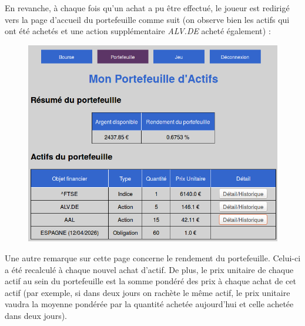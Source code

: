 \begin{enumerate}
      En revanche, à chaque fois qu'un achat a pu être effectué, le joueur est redirigé vers la page d'accueil du portefeuille comme suit (on observe bien les actifs qui ont été achetés et une action supplémentaire \textit{ALV.DE} acheté également) :
      \begin{figure}[H]
	\center
	\includegraphics[scale=0.5]{../graph/7-vueportefeuilleapresachats.png}
      \end{figure}
      Une autre remarque sur cette page concerne le rendement du portefeuille. Celui-ci a été recalculé à chaque nouvel achat d'actif. De plus, le prix unitaire de chaque actif au sein du portefeuille est la somme pondéré des prix à chaque achat de cet actif (par exemple, si dans deux jours on rachète le même actif, le prix unitaire vaudra la moyenne pondérée par la quantité achetée aujourd'hui et celle achetée dans deux jours).
      

\end{enumerate}
